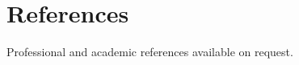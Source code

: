\documentclass[a4paper,10pt]{article} %
\begin{document}

\section{References}

Professional and academic references available on request.

\end{document}
